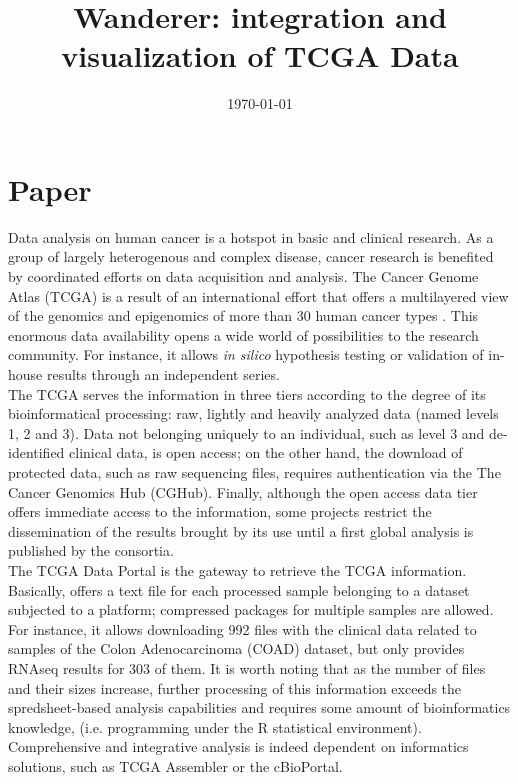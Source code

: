 \documentclass{article}
\title{Wanderer: integration and visualization of TCGA Data}
\date{\today}
\begin{document}
\maketitle

\section{Paper}

Data analysis on human cancer is a hotspot in basic and clinical research. As a group of largely heterogenous and complex disease, cancer research is benefited by coordinated efforts on data acquisition and analysis. The Cancer Genome Atlas (TCGA) is a result of an international effort that offers a multilayered view of the genomics and epigenomics of more than 30 human cancer types \cite{weinstein2013cancer}. This enormous data availability opens a wide world of possibilities to the research community. For instance, it allows \textit{in silico} hypothesis testing or validation of in-house results through an independent series.\\

The TCGA serves the information in three tiers according to the degree of its bioinformatical processing: raw, lightly and heavily analyzed data (named levels 1, 2 and 3). Data not belonging uniquely to an individual, such as level 3 and de-identified clinical data, is open access; on the other hand, the download of protected data, such as raw sequencing files, requires authentication via the The Cancer Genomics Hub (CGHub)\cite{wilks2014cancer}. Finally, although the open access data tier offers immediate access to the information, some projects restrict the dissemination of the results brought by its use until a first global analysis is published by the consortia.\\

The TCGA Data Portal is the gateway to retrieve the TCGA information. Basically, offers a text file for each processed sample belonging to a dataset subjected to a platform; compressed packages for multiple samples are allowed. For instance, it allows downloading 992 files with the clinical data related to samples of the Colon Adenocarcinoma (COAD) dataset, but only provides RNAseq results for 303 of them. It is worth noting that as the number of files and their sizes increase, further processing of this information exceeds the spredsheet-based analysis capabilities and requires some amount of bioinformatics knowledge, (i.e. programming under the R statistical environment). Comprehensive and integrative analysis is indeed dependent on informatics solutions, such as TCGA Assembler \cite{zhu2014tcga} or the cBioPortal\cite{gao2013integrative}.\\
\end{document}
